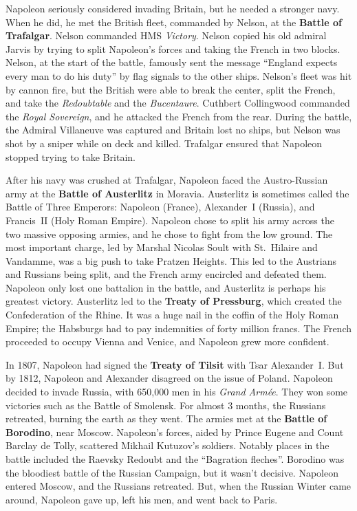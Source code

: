 Napoleon seriously considered invading Britain, but he needed a stronger navy.
When he did, he met the British fleet, commanded by Nelson, at the \textbf{Battle of Trafalgar}.
Nelson commanded HMS \textit{Victory}.
Nelson copied his old admiral Jarvis by trying to split Napoleon's forces and taking the French in two blocks.
Nelson, at the start of the battle, famously sent the message
``England expects every man to do his duty'' by flag signals to the other ships.
Nelson's fleet was hit by cannon fire, but the British were able to break the center, split the French,
and take the \textit{Redoubtable} and the \textit{Bucentaure}.
Cuthbert Collingwood commanded the \textit{Royal Sovereign}, and he attacked the French from the rear.
During the battle, the Admiral Villaneuve was captured and Britain lost no ships,
but Nelson was shot by a sniper while on deck and killed.
Trafalgar ensured that Napoleon stopped trying to take Britain.

After his navy was crushed at Trafalgar,
Napoleon faced the Austro-Russian army at the \textbf{Battle of Austerlitz} in Moravia.
Austerlitz is sometimes called the Battle of Three Emperors:
Napoleon (France), Alexander~I (Russia), and Francis~II (Holy Roman Empire).
Napoleon chose to split his army across the two massive opposing armies, and he chose to fight from the low ground.
The most important charge, led by Marshal Nicolas Soult with St.\ Hilaire and Vandamme,
was a big push to take Pratzen Heights.
This led to the Austrians and Russians being split, and the French army encircled and defeated them.
Napoleon only lost one battalion in the battle, and Austerlitz is perhaps his greatest victory.
Austerlitz led to the \textbf{Treaty of Pressburg}, which created the Confederation of the Rhine.
It was a huge nail in the coffin of the Holy Roman Empire;
the Habsburgs had to pay indemnities of forty million francs.
The French proceeded to occupy Vienna and Venice, and Napoleon grew more confident.

In 1807, Napoleon had signed the \textbf{Treaty of Tilsit} with Tsar Alexander~I.
But by 1812, Napoleon and Alexander disagreed on the issue of Poland.
Napoleon decided to invade Russia, with 650,000 men in his \textit{Grand Arm\'ee}.
They won some victories such as the Battle of Smolensk.
For almost 3 months, the Russians retreated, burning the earth as they went.
The armies met at the \textbf{Battle of Borodino}, near Moscow.
Napoleon's forces, aided by Prince Eugene and Count Barclay de Tolly, scattered Mikhail Kutuzov's soldiers.
Notably places in the battle included the Raevsky Redoubt and the ``Bagration fleches''.
Borodino was the bloodiest battle of the Russian Campaign, but it wasn't decisive.
Napoleon entered Moscow, and the Russians retreated.
But, when the Russian Winter came around, Napoleon gave up, left his men, and went back to Paris.

